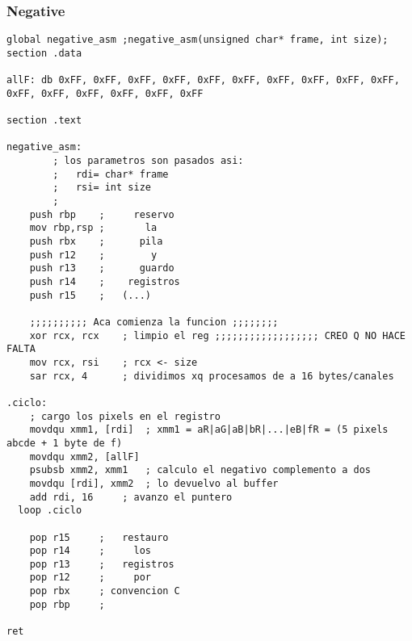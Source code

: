 \subsubsection{Negative}
\begin{verbatim}
global negative_asm ;negative_asm(unsigned char* frame, int size);
section .data

allF: db 0xFF, 0xFF, 0xFF, 0xFF, 0xFF, 0xFF, 0xFF, 0xFF, 0xFF, 0xFF, 0xFF, 0xFF, 0xFF, 0xFF, 0xFF, 0xFF

section .text

negative_asm:
        ; los parametros son pasados asi:
        ;	rdi= char* frame
        ;	rsi= int size
        ;
	push rbp	;     reservo
	mov rbp,rsp	;       la
	push rbx	;      pila
	push r12	;        y
	push r13	;      guardo
	push r14	;    registros
	push r15	;   (...)

	;;;;;;;;;; Aca comienza la funcion ;;;;;;;;
	xor rcx, rcx	; limpio el reg ;;;;;;;;;;;;;;;;;; CREO Q NO HACE FALTA
	mov rcx, rsi	; rcx <- size
	sar rcx, 4	    ; dividimos xq procesamos de a 16 bytes/canales
        
.ciclo:
    ; cargo los pixels en el registro
    movdqu xmm1, [rdi]	; xmm1 = aR|aG|aB|bR|...|eB|fR = (5 pixels abcde + 1 byte de f)	
    movdqu xmm2, [allF]
    psubsb xmm2, xmm1	; calculo el negativo complemento a dos
    movdqu [rdi], xmm2	; lo devuelvo al buffer
    add rdi, 16 	; avanzo el puntero
  loop .ciclo

	pop r15		;   restauro
	pop r14		;     los
	pop r13		;   registros
	pop r12		;     por
	pop rbx		; convencion C
	pop rbp		;

ret


\end{verbatim}

